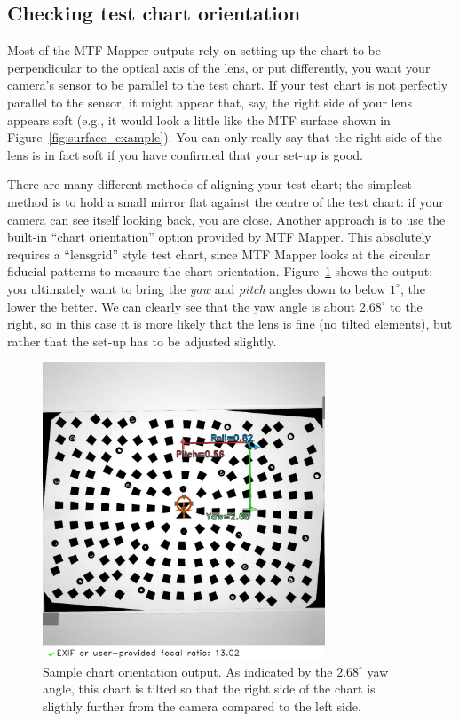 \documentclass[a4paper]{article}
\begin{document}
\subsection{Checking test chart orientation}
\label{sec:chart_orientation}
Most of the MTF Mapper outputs rely on setting up the chart to be
perpendicular to the optical axis of the lens, or put differently, you want
your camera's sensor to be parallel to the test chart. If your test chart is not
perfectly parallel to the sensor, it might appear that, say, the right side of
your lens appears soft (e.g., it would look a little like the MTF surface
shown in Figure~\ref{fig:surface_example}). You can only really say that the
right side of the lens is in fact soft if you have confirmed that your
set-up is good.

There are many different methods of aligning your test chart; the simplest
method is to hold a small mirror flat against the centre of the test chart: if your camera
can see itself looking back, you are close. Another approach is to use the
built-in ``chart orientation'' option provided by MTF Mapper. This
absolutely requires a ``lensgrid'' style test chart, since MTF Mapper looks
at the circular fiducial patterns to measure the chart orientation.
Figure~\ref{fig:chart_orientation_example} shows the output: you ultimately
want to bring the \emph{yaw} and \emph{pitch} angles down to below
$1^\circ$, the lower the better. We can clearly see that the yaw angle is
about $2.68^\circ$ to the right, so in this case it is more likely that the
lens is fine (no tilted elements), but rather that the set-up has to be
adjusted slightly.

\begin{figure}[!ht]
\centering
\includegraphics[width=0.75\textwidth]{figures/orientation_example}
\caption{Sample chart orientation output. As indicated by the $2.68^\circ$
yaw angle, this chart is tilted so that the right side of the chart is sligthly further
from the camera compared to the left side.}
\label{fig:chart_orientation_example}
\end{figure}
\end{document}
